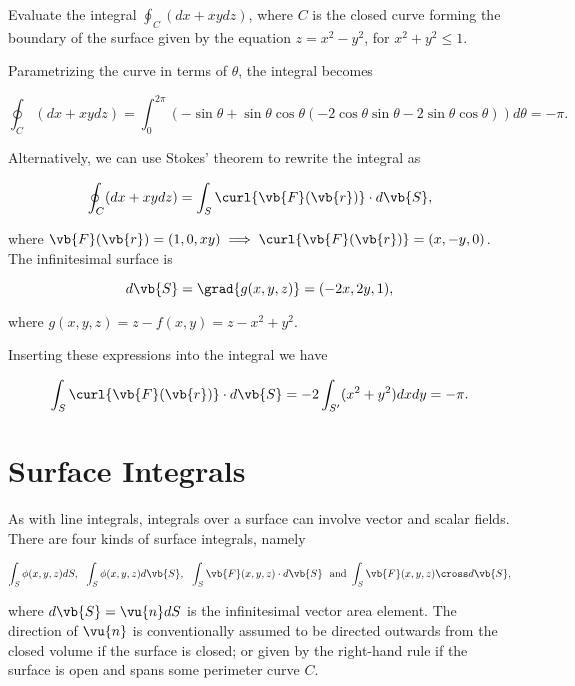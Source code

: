 \documentclass[english,a4paper,12pt]{report}
\begin{document}
{Evaluate the integral \(\oint_{C} (dx + xydz)\), where \(C\) is the closed curve forming the boundary of the surface given by the equation \(z = x^2 - y^2\), for \(x^2 + y^2 \le 1\).}
{Parametrizing the curve in terms of \(\theta \), the integral becomes 

\begin{equation}
	\oint_{C} (dx+xydz) = \int_{0}^{2\pi }(-\sin \theta +\sin \theta \cos \theta (-2\cos \theta \sin \theta -2\sin \theta \cos \theta ))d \theta = -\pi .  
\end{equation}

Alternatively, we can use Stokes' theorem to rewrite the integral as 

\begin{equation}
	\oint_{C} (dx+xydz) = \int_{S}^{} \curl{\vb{F} (\vb{r} )}\cdot d\vb{S} ,    
\end{equation}

where \(\vb{F} (\vb{r} ) = (1,0,xy) \implies \curl{\vb{F} (\vb{r} )} = (x,-y,0) \). The infinitesimal surface is 

\begin{equation}
	d\vb{S} = \grad{g(x,y,z)} = (-2x,2y,1), 
\end{equation}

where \(g(x,y,z) = z - f(x,y) = z - x^2 + y^2\). 

Inserting these expressions into the integral we have

\begin{equation}
	\int_{S}^{} \curl{\vb{F} (\vb{r} )}\cdot d\vb{S} = -2 \int_{S'}^{} (x^2 + y^2)dxdy  = -\pi .  
\end{equation}

} 




\section{Surface Integrals}
As with line integrals, integrals over a surface can involve vector and scalar fields. There are four kinds of surface integrals, namely 

\begin{equation}
    \int_{S}^{} \phi(x,y,z) dS,  ~~ \int_{S}^{} \phi(x,y,z) d\vb{S} , ~~ \int_{S}^{} \vb{F}(x,y,z) \cdot d\vb{S} ~ \text { and } \int_{S}^{} \vb{F}(x,y,z) \cross d\vb{S},    
\end{equation}

where \(d\vb{S} = \vu{n} dS\) is the infinitesimal vector area element. The direction of \(\vu{n} \) is conventionally assumed to be directed outwards from the closed volume if the surface is closed; or given by the right-hand rule if the surface is open and spans some perimeter curve \(C\). 
\end{document}
